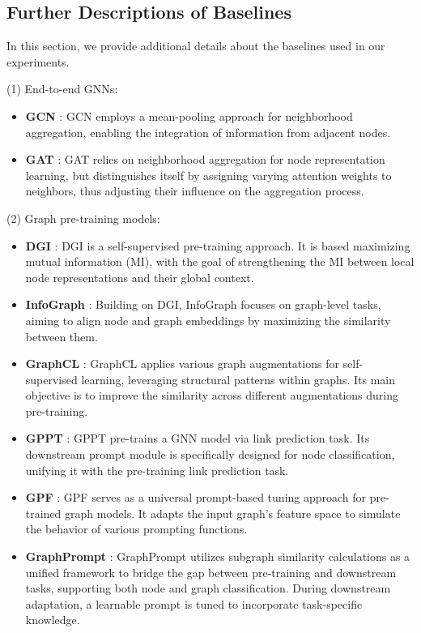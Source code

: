 \subsection{Further Descriptions of Baselines} \label{app.baselines}
In this section, we provide additional details about the baselines used in our experiments.

\vspace{1mm}
\noindent (1) End-to-end GNNs:
\begin{itemize}[leftmargin=*]
    \item \textbf{GCN} \cite{kipf2016semi}: GCN employs a mean-pooling approach for neighborhood aggregation, enabling the integration of information from adjacent nodes.
    \item \textbf{GAT} \cite{velivckovic2017graph}: GAT relies on neighborhood aggregation for node representation learning, but distinguishes itself by assigning varying attention weights to neighbors, thus adjusting their influence on the aggregation process.
\end{itemize}

\noindent (2) Graph pre-training models:
\begin{itemize}[leftmargin=*]
    \item \textbf{DGI} \cite{velivckovic2017graph}: DGI is a self-supervised pre-training approach. It is based maximizing mutual information (MI), with the goal of strengthening the MI between local node representations and their global context.
    \item \textbf{InfoGraph} \cite{sun2019infograph}: Building on DGI, InfoGraph focuses on graph-level tasks, aiming to align node and graph embeddings by maximizing the similarity between them.
    \item \textbf{GraphCL} \cite{you2020graph}: GraphCL applies various graph augmentations for self-supervised learning, leveraging structural patterns within graphs. Its main objective is to improve the similarity across different augmentations during pre-training.
    \item \textbf{GPPT} \cite{sun2022gppt}: GPPT pre-trains a GNN model via link prediction task. Its downstream prompt module is specifically designed for node classification, unifying it with the pre-training link prediction task.
    \item \textbf{GPF} \cite{fang2022universal}: GPF serves as a universal prompt-based tuning approach for pre-trained graph models. It adapts the input graph's feature space to simulate the behavior of various prompting functions.
    \item \textbf{GraphPrompt} \cite{liu2023graphprompt}: GraphPrompt utilizes subgraph similarity calculations as a unified framework to bridge the gap between pre-training and downstream tasks, supporting both node and graph classification. During downstream adaptation, a learnable prompt is tuned to incorporate task-specific knowledge.
\end{itemize}

